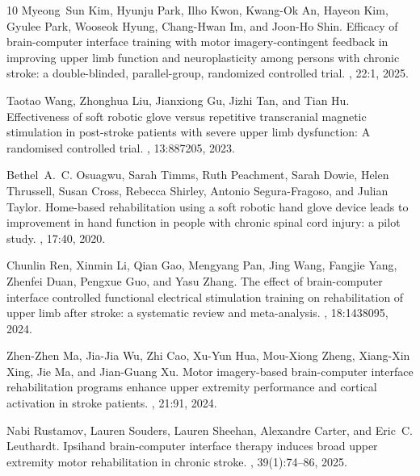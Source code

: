 \documentclass[a4paper,11pt]{article}
\begin{document}
\begin{thebibliography}{10}
Myeong~Sun Kim, Hyunju Park, Ilho Kwon, Kwang-Ok An, Hayeon Kim, Gyulee Park,
  Wooseok Hyung, Chang-Hwan Im, and Joon-Ho Shin.
\newblock Efficacy of brain-computer interface training with motor
  imagery-contingent feedback in improving upper limb function and
  neuroplasticity among persons with chronic stroke: a double-blinded,
  parallel-group, randomized controlled trial.
, 22:1, 2025.

Taotao Wang, Zhonghua Liu, Jianxiong Gu, Jizhi Tan, and Tian Hu.
\newblock Effectiveness of soft robotic glove versus repetitive transcranial
  magnetic stimulation in post-stroke patients with severe upper limb
  dysfunction: A randomised controlled trial.
, 13:887205, 2023.

Bethel~A.~C. Osuagwu, Sarah Timms, Ruth Peachment, Sarah Dowie, Helen
  Thrussell, Susan Cross, Rebecca Shirley, Antonio Segura-Fragoso, and Julian
  Taylor.
\newblock Home-based rehabilitation using a soft robotic hand glove device
  leads to improvement in hand function in people with chronic spinal cord
  injury: a pilot study.
, 17:40, 2020.

Chunlin Ren, Xinmin Li, Qian Gao, Mengyang Pan, Jing Wang, Fangjie Yang,
  Zhenfei Duan, Pengxue Guo, and Yasu Zhang.
\newblock The effect of brain-computer interface controlled functional
  electrical stimulation training on rehabilitation of upper limb after stroke:
  a systematic review and meta-analysis.
, 18:1438095, 2024.

Zhen-Zhen Ma, Jia-Jia Wu, Zhi Cao, Xu-Yun Hua, Mou-Xiong Zheng,
  Xiang-Xin Xing, Jie Ma, and Jian-Guang Xu.
\newblock Motor imagery-based brain-computer interface rehabilitation programs
  enhance upper extremity performance and cortical activation in stroke
  patients.
, 21:91, 2024.

Nabi Rustamov, Lauren Souders, Lauren Sheehan, Alexandre Carter, and Eric~C.
  Leuthardt.
\newblock Ipsihand brain-computer interface therapy induces broad upper
  extremity motor rehabilitation in chronic stroke.
, 39(1):74--86, 2025.


\end{thebibliography}
\end{document}
